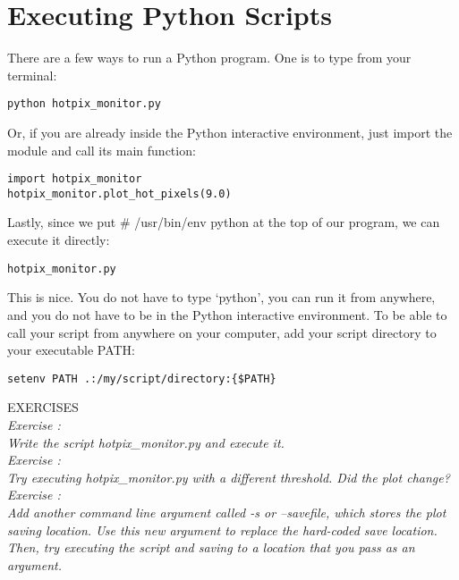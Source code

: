 \section{Executing Python Scripts}

There are a few ways to run a Python program.  One is to type from your terminal:

\texttt{\termtab python hotpix\_monitor.py}

Or, if you are already inside the Python interactive environment, just
import the module and call its main function:

\texttt{\pytab import hotpix\_monitor} \\
\texttt{\pytab hotpix\_monitor.plot\_hot\_pixels(9.0)}

Lastly, since we put {\sf\small \#\! /usr/bin/env python} at the top of our program, we can
execute it directly:

\texttt{\termtab hotpix\_monitor.py}

This is nice.  You do not have to type `python', you can run it from
anywhere, and you do not have to be in the Python interactive
environment.  To be able to call your script from anywhere on your computer, add
your script directory to your executable PATH:

\texttt{setenv PATH .:/my/script/directory:\{\$PATH\}}

{\color{blue} {\sf\small EXERCISES}} \\
{\it Exercise  :  \\
  Write the script {\sf\small hotpix\_monitor.py} and execute it.
} \\
{\it Exercise  :  \\
  Try executing {\sf\small hotpix\_monitor.py} with a different threshold.  Did the plot
  change?
} \\
{\it Exercise  :  \\
  Add another command line argument called {\sf\small -s} or {\sf\small --savefile},
  which stores the plot saving location.  Use this new argument to replace the hard-coded
  save location.  Then, try executing the script and saving to a location that you pass
  as an argument.
}

